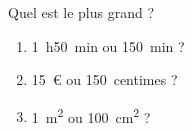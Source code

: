 
\begin{mental}
    Quel est le plus grand ?
    \begin{enumerate}
        \item
            \SI{1}{\hour}\SI{50}{\minute} ou \SI{150}{\minute} ?
        \item
            \SI{15}{€} ou \SI{150}{centimes} ?
        \item
            \SI{1}{\meter\squared} ou \SI{100}{\centi\meter\squared} ?
    \end{enumerate}
\end{mental}
